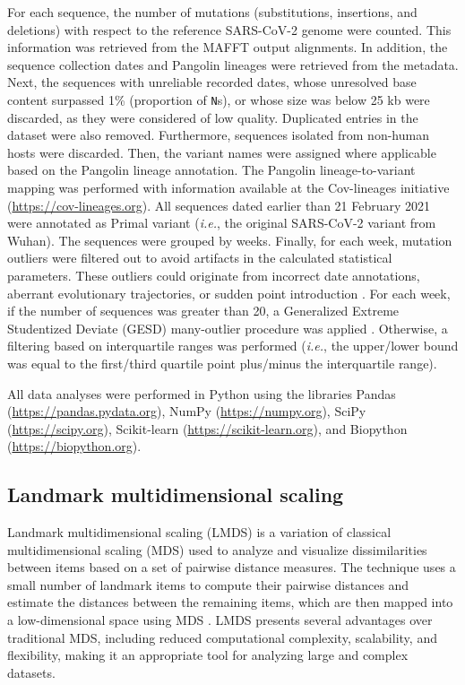 For each sequence, the number of mutations (substitutions, insertions, and deletions) with respect to the reference SARS-CoV-2 genome were counted. This information was retrieved from the MAFFT output alignments. In addition, the sequence collection dates and Pangolin lineages were retrieved from the metadata. Next, the sequences with unreliable recorded dates, whose unresolved base content surpassed 1\% (proportion of \texttt{N}s), or whose size was below 25 kb were discarded, as they were considered of low quality. Duplicated entries in the dataset were also removed. Furthermore, sequences isolated from non-human hosts were discarded. Then, the variant names were assigned where applicable based on the Pangolin lineage annotation. The Pangolin lineage-to-variant mapping was performed with information available at the Cov-lineages initiative (\url{https://cov-lineages.org}). All sequences dated earlier than 21 February 2021 were annotated as Primal variant (\textit{i.e.}, the original SARS-CoV-2 variant from Wuhan). The sequences were grouped by weeks. Finally, for each week, mutation outliers were filtered out to avoid artifacts in the calculated statistical parameters. These outliers could originate from incorrect date annotations, aberrant evolutionary trajectories, or sudden point introduction \cite{hill2022, michaelsen2022}. For each week, if the number of sequences was greater than 20, a Generalized Extreme Studentized Deviate (GESD) many-outlier procedure was applied \cite{rosner1983}. Otherwise, a filtering based on interquartile ranges was performed (\textit{i.e.}, the upper/lower bound was equal to the first/third quartile point plus/minus the interquartile range).

All data analyses were performed in Python using the libraries Pandas (\url{https://pandas.pydata.org}), NumPy (\url{https://numpy.org}), SciPy (\url{https://scipy.org}), Scikit-learn (\url{https://scikit-learn.org}), and Biopython (\url{https://biopython.org}).

\subsection{Landmark multidimensional scaling} %

Landmark multidimensional scaling (LMDS) is a variation of classical multidimensional scaling (MDS) \cite{mead1992} used to analyze and visualize dissimilarities between items based on a set of pairwise distance measures. The technique uses a small number of landmark items to compute their pairwise distances and estimate the distances between the remaining items, which are then mapped into a low-dimensional space using MDS \cite{deSilva2003}. LMDS presents several advantages over traditional MDS, including reduced computational complexity, scalability, and flexibility, making it an appropriate tool for analyzing large and complex datasets.

